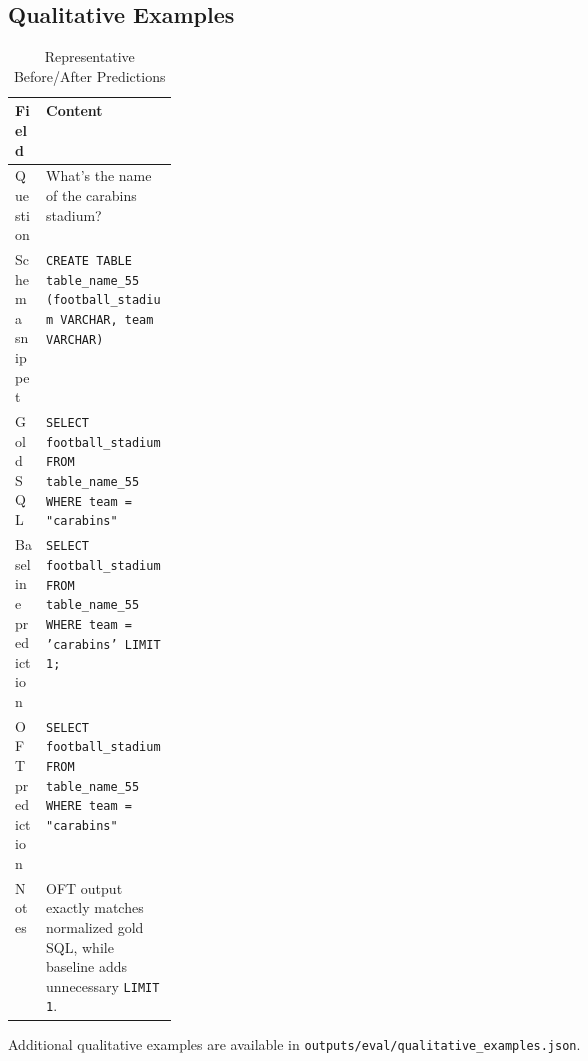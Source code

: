 \documentclass[11pt]{article}
\begin{document}
\subsection{Qualitative Examples}
\begin{table}[H]
    \centering
    \caption{Representative Before/After Predictions}
    \begin{tabularx}{\linewidth}{>{\raggedright\arraybackslash}p{0.19\linewidth}X}
        \toprule
        Field & Content \\
        \midrule
        Question & What's the name of the carabins stadium? \\
        Schema snippet & \texttt{CREATE TABLE table\_name\_55 (football\_stadium VARCHAR, team VARCHAR)} \\
        Gold SQL & \texttt{SELECT football\_stadium FROM table\_name\_55 WHERE team = "carabins"} \\
        Baseline prediction & \texttt{SELECT football\_stadium FROM table\_name\_55 WHERE team = 'carabins' LIMIT 1;} \\
        OFT prediction & \texttt{SELECT football\_stadium FROM table\_name\_55 WHERE team = "carabins"} \\
        Notes & OFT output exactly matches normalized gold SQL, while baseline adds unnecessary \texttt{LIMIT 1}. \\
        \bottomrule
    \end{tabularx}
\end{table}

\noindent Additional qualitative examples are available in \texttt{outputs/eval/qualitative\_examples.json}.
\end{document}
